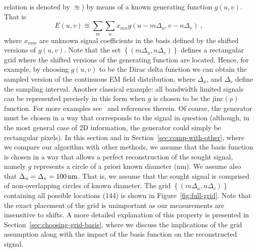 relation is denoted by $\approxeq$) by means of a known generating
function $g(u,v)$. That is
\begin{equation}
  \label{eq:sparse-1}
  E(u,v) \approxeq \sum_{m}\sum_{n} x_{mn}g(u-m\Delta_{u}, v - n\Delta_{v})\ ,
\end{equation}
where ${x_{mm}}$ are unknown signal coefficients in the basis defined
by the shifted versions of $g(u,v)$. Note that the set
$\left\{(m\Delta_{u}, n\Delta_{v})\right\}$ defines a rectangular grid
where the shifted versions of the generating function are
located. Hence, for example, by choosing $g(u,v)$ to be the Dirac
delta function we can obtain the sampled version of the continuous EM
field distribution, where $\Delta_{u}$, and $\Delta_{v}$ define the
sampling interval.  Another classical example: all bandwidth limited
signals can be represented precisely in this form when $g$ is chosen
to be the $\mathrm{jinc(\rho)}$ function. For more examples
see~ and references therein. Of course, the
generator must be chosen in a way that corresponds to the signal in
question (although, in the most general case of 2D information, the
generator could simply be rectangular pixels).  In this section and in
Section~\ref{sec:comp-with-other}, where we compare our algorithm with
other methods, we assume that the basis function is chosen in a way
that allows a perfect reconstruction of the sought signal, namely $g$
represents a circle of a priori known diameter (\unit[100]{nm}). We assume
also that $\Delta_{u}=\Delta_{v}=\unit[100]{nm}$. That is, we assume that the
sought signal is comprised of non-overlapping circles of known
diameter.  The grid $\left\{(m\Delta_{u}, n\Delta_{v})\right\}$
containing all possible locations (144) is shown in
Figure~\ref{fig:full-grid}. Note that the exact placement of the grid
is unimportant as our measurements are insensitive to shifts.  A more
detailed explanation of this property is presented in
Section~\ref{sec:choosing-grid-basis}, where we discuss the
implications of the grid assumption along with the impact of the basis
function on the reconstructed signal.


